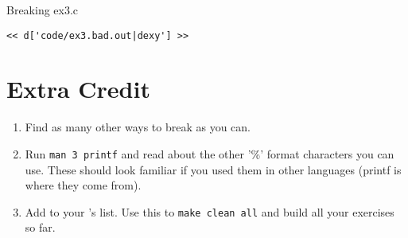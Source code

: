 \begin{Terminal}{Breaking ex3.c}
\begin{lstlisting}
<< d['code/ex3.bad.out|dexy'] >>
\end{lstlisting}
\end{Terminal}

\section{Extra Credit}

\begin{enumerate}
\item Find as many other ways to break  as you can.
\item Run \verb|man 3 printf| and read about the other '\%' format
    characters you can use.  These should look familiar if you used
    them in other languages (printf is where they come from).
\item Add  to your 's  list.  Use this
    to \verb|make clean all| and build all your exercises so far.
\end{enumerate}


